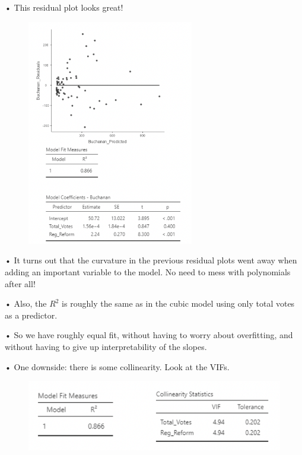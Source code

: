 \documentclass[
  letterpaper,
  DIV=11,
  numbers=noendperiod]{scrreprt}
\begin{document}
• This residual plot looks great!

\begin{figure}

{\centering \includegraphics[width=2.86458in,height=\textheight]{images/mod4_pt2_19.png}

}

\end{figure}

• It turns out that the curvature in the previous residual plots went
away when adding an important variable to the model. No need to mess
with polynomials after all!

• Also, the \(R^2\) is roughly the same as in the cubic model using only
total votes as a predictor.

• So we have roughly equal fit, without having to worry about
overfitting, and without having to give up interpretability of the
slopes.

• One downside: there is some collinearity. Look at the VIFs.

\begin{figure}

{\centering \includegraphics{images/mod4_pt2_20.png}

}

\end{figure}
\end{document}
